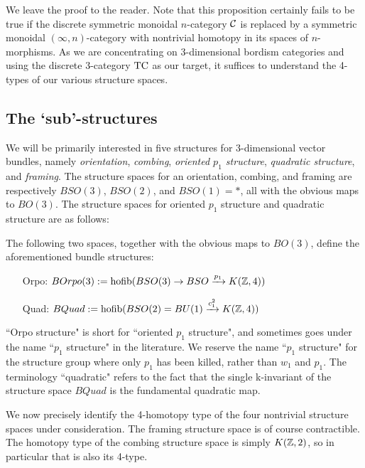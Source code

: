 \documentclass{amsart}
\begin{document}
\nid We leave the proof to the reader.  Note that this proposition certainly fails to be true if the discrete symmetric monoidal $n$-category $\mathcal C$ is replaced by a symmetric monoidal $(\infty,n)$-category with nontrivial homotopy in its spaces of $n$-morphisms.  As we are concentrating on 3-dimensional bordism categories and using the discrete 3-category $\mathrm{TC}$ as our target, it suffices to understand the 4-types of our various structure spaces.


\subsection{The `sub'-structures}


We will be primarily interested in five structures for 3-dimensional vector bundles, namely \emph{orientation}, \emph{combing}, \emph{oriented $p_1$ structure}, \emph{quadratic structure}, and \emph{framing}.  The structure spaces for an orientation, combing, and framing are respectively $BSO(3)$, $BSO(2)$, and $BSO(1) = *$, all with the obvious maps to $BO(3)$.  The structure spaces for oriented $p_1$ structure and quadratic structure are as follows:
\begin{definition}
The following two spaces, together with the obvious maps to $BO(3)$, define the aforementioned bundle structures:
\begin{itemize}
\item[Orpo:] $BOrpo(3) := \operatorname{hofib}(BSO(3) \rightarrow BSO \xrightarrow{p_1} K(\mathbb Z,4))$
\item[Quad:] $BQuad := \operatorname{hofib}(BSO(2) = BU(1) \xrightarrow{c_1^2} K(\mathbb Z,4))$
\end{itemize}
\end{definition}

\begin{remark}
``Orpo structure" is short for ``oriented $p_1$ structure", and sometimes goes under the name ``$p_1$ structure" in the literature.  We reserve the name ``$p_1$ structure" for the structure group where only $p_1$ has been killed, rather than $w_1$ and $p_1$.  The terminology ``quadratic" refers to the fact that the single k-invariant of the structure space $BQuad$ is the fundamental quadratic map.
\end{remark}


We now precisely identify the 4-homotopy type of the four nontrivial structure spaces under consideration.  The framing structure space is of course contractible.  The homotopy type of the combing structure space is simply $K(\mathbb Z,2)$, so in particular that is also its 4-type.
\end{document}
